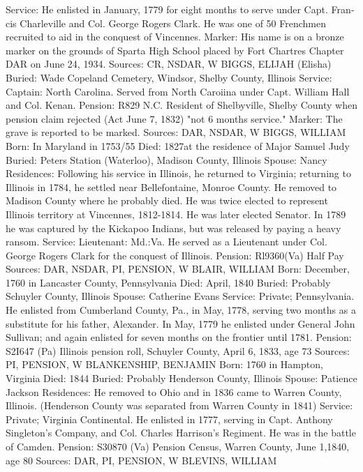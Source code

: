 Service: He enlisted in January, 1779 for eight months to serve under Capt. Fran­cis Charleville and Col. George Rogers Clark. He was one of 50 Frenchmen recruited to aid in the conquest of Vincennes. 
Marker: His name is on a bronze marker on the grounds of Sparta High School placed by Fort Chartres Chapter DAR on June 24, 1934. 
Sources: CR, NSDAR, W 
BIGGS, ELIJAH (Elisha) 
Buried: Wade Copeland Cemetery, Windsor, Shelby County, Illinois
Service: Captain: North Carolina. Served from North Caroiina under Capt. Wil­liam Hall and Col. Kenan. 
Pension: R829 N.C. Resident of Shelbyville, Shelby County when pension claim rejected (Act June 7, 1832) "not 6 months service." 
Marker: The grave is reported to be marked. Sources: DAR, NSDAR, W 
BIGGS, WILLIAM 
Born: In Maryland in 1753/55 
Died: 1827at the residence of Major Samuel Judy 
Buried: Peters Station (Waterloo), Madison County, Illinois 
Spouse: Nancy Residences: Following his service in Illinois, he returned to Virginia; returning to Illinois in 1784, he settled near Bellefontaine, Monroe County. He re­moved to Madison County where he probably died. He was twice elected to represent Illinois territory at Vincennes, 1812-1814. He was later elected Senator. In 1789 he was captured by the Kickapoo Indians, but was released by paying a heavy ransom. 
Service: Lieutenant: Md.:Va. He served as a Lieutenant under Col. George Rogers Clark for the conquest of Illinois. 
Pension: Rl9360(Va) Half Pay 
Sources: DAR, NSDAR, PI, PENSION, W 
BLAIR, WILLIAM 
Born: December, 1760 in Lancaster County, Pennsylvania 
Died: April, 1840 
Buried: Probably Schuyler County, Illinois 
Spouse: Catherine Evans 
Service: Private; Pennsylvania. He enlisted from Cumberland County, Pa., in May, 1778, serving two months as a substitute for his father, Alexander. In May, 1779 he enlisted under General John Sullivan; and again enlisted for seven months on the frontier until 1781. 
Pension: S2I647 (Pa) Illinois pension roll, Schuyler County, April 6, 1833, age 73 
Sources: PI, PENSION, W 
BLANKENSHIP, BENJAMIN 
Born: 1760 in Hampton, Virginia 
Died: 1844 
Buried: Probably Henderson County, Illinois 
Spouse: Patience Jackson 
Residences: He removed to Ohio and in 1836 came to Warren County, Illinois. (Henderson County was separated from Warren County in 1841) 
Service: Private; Virginia Continental. He enlisted in 1777, serving in Capt. Anthony Singleton's Company, and Col. Charles Harrison's Regiment. He was in the battle of Camden. 
Pension: S30870 (Va) Pension Census, Warren County, June 1,1840, age 80 
Sources: DAR, PI, PENSION, W 
BLEVINS, WILLIAM 
